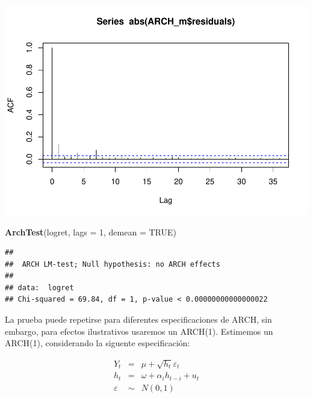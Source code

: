 \documentclass[
]{book}
\newenvironment{Shaded}{\begin{snugshade}}{\end{snugshade}}
\newcommand{\AttributeTok}[1]{\textcolor[rgb]{0.13,0.29,0.53}{#1}}
\newcommand{\ConstantTok}[1]{\textcolor[rgb]{0.56,0.35,0.01}{#1}}
\newcommand{\DecValTok}[1]{\textcolor[rgb]{0.00,0.00,0.81}{#1}}
\newcommand{\FunctionTok}[1]{\textcolor[rgb]{0.13,0.29,0.53}{\textbf{#1}}}
\newcommand{\NormalTok}[1]{#1}
\newcommand{\SpecialCharTok}[1]{\textcolor[rgb]{0.81,0.36,0.00}{\textbf{#1}}}
\begin{document}
\begin{Shaded}
\end{Shaded}

\includegraphics{Notas-Series-Tiempo_files/figure-latex/ArchTest-2.pdf}

\begin{Shaded}
\begin{Highlighting}[]
\FunctionTok{ArchTest}\NormalTok{(logret, }\AttributeTok{lags =} \DecValTok{1}\NormalTok{, }\AttributeTok{demean =} \ConstantTok{TRUE}\NormalTok{)}
\end{Highlighting}
\end{Shaded}

\begin{verbatim}
## 
##  ARCH LM-test; Null hypothesis: no ARCH effects
## 
## data:  logret
## Chi-squared = 69.84, df = 1, p-value < 0.00000000000000022
\end{verbatim}

La prueba puede repetirse para diferentes especificaciones de ARCH, sin embargo, para efectos ilustrativos usaremos un ARCH(1). Estimemos un ARCH(1), considerando la siguente especificación:

\begin{eqnarray*}
    Y_t & = & \mu+\sqrt{h_t}\varepsilon_t \\
    h_t & = & \omega+\alpha_ih_{t-i}+u_t \\
    \varepsilon & \sim & N(0,1)
\end{eqnarray*}
\end{document}
